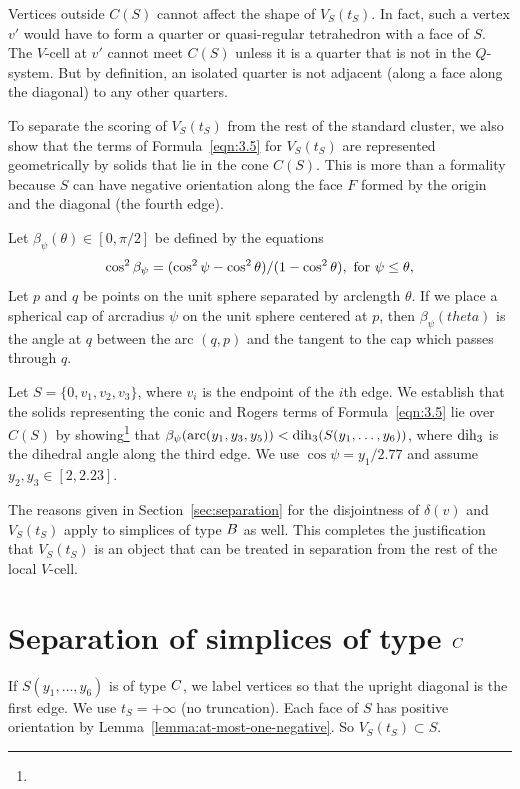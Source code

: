 Vertices outside $C(S)$ cannot affect the shape of $V_S(t_S)$.  In
fact, such a vertex $v'$ would have to form a quarter or
quasi-regular tetrahedron with a face of $S$.  The $V$-cell at
$v'$ cannot meet $C(S)$ unless it is a quarter that is not in the
$Q$-system. But by definition, an isolated quarter is not adjacent
(along a face along the diagonal) to any other quarters.

To separate the scoring of $V_S(t_S)$ from the rest of the
standard cluster, we also show that the terms of
Formula~\ref{eqn:3.5}  for $V_S(t_S)$ are represented
geometrically by solids that lie in the cone $C(S)$. This is more
than a formality because $S$ can have negative orientation along
the face $F$ formed by the origin and the diagonal (the fourth
edge).

\begin{definition}
Let
    $\beta_\psi(\theta)\in[0,\pi/2]$
be defined by the equations
    $$
        \cos^2\beta_\psi = (\cos^2\psi-\cos^2\theta)/(1-\cos^2\theta),
        \hbox{ for }\psi\le\theta,
    $$
Let $p$ and $q$ be points on the unit sphere separated by
arclength $\theta$. If we place a spherical cap of arcradius
$\psi$ on the unit sphere centered at $p$, then
$\beta_\psi(theta)$ is the angle at $q$ between the arc $(q,p)$
and the tangent to the cap which passes through $q$.
\end{definition}

Let $S=\{0,v_1,v_2,v_3\}$, where $v_i$ is the endpoint of the $i$th
edge. We establish that the solids representing the conic and
Rogers terms of Formula~\ref{eqn:3.5} lie over $C(S)$ by
showing\footnote{} that
    $\beta_\psi(\operatorname{arc}(y_1,y_3,y_5)) < \operatorname{dih}_3(S(y_1,\ldots,y_6))$,
where $\operatorname{dih}_3$ is the dihedral angle along the third edge. We use
$\cos\psi = y_1/2.77$ and assume $y_2,y_3\in[2,2.23]$.

The reasons given in Section~\ref{sec:separation} for the
disjointness of $\delta(v)$ and $V_S(t_S)$ apply to simplices of
type $B$ as well. This completes the justification that
$V_S(t_S)$ is an object that can be treated in separation from the
rest of the local $V$-cell.

\section{Separation of simplices of type $C$}

If $S(y_1,\ldots,y_6)$ is of type $C$, we label vertices so that
the upright diagonal is the first edge.  We use $t_S =+\infty$ (no
truncation).   Each face of $S$ has positive orientation by
Lemma~\ref{lemma:at-most-one-negative}. So $V_S(t_S)\subset S$.

